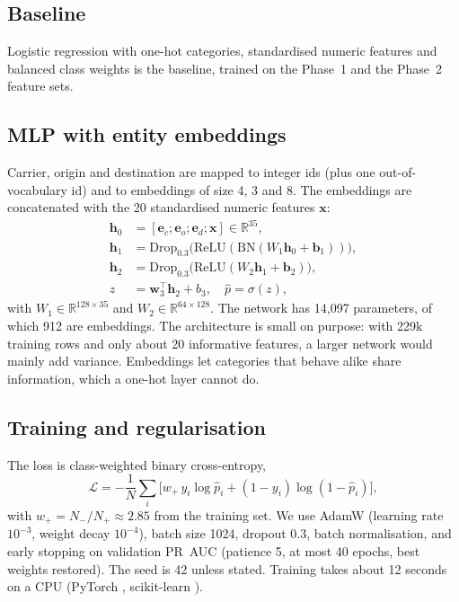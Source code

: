 \documentclass[conference]{IEEEtran}
\begin{document}
\subsection{Baseline}
Logistic regression with one-hot categories, standardised numeric features and balanced class weights is the baseline, trained on the Phase~1 and the Phase~2 feature sets.

\subsection{MLP with entity embeddings}
Carrier, origin and destination are mapped to integer ids (plus one out-of-vocabulary id) and to embeddings of size 4, 3 and 8. The embeddings are concatenated with the 20 standardised numeric features $\mathbf{x}$:
\begin{align}
\mathbf{h}_0 &= [\mathbf{e}_c;\mathbf{e}_o;\mathbf{e}_d;\mathbf{x}]\in\mathbb{R}^{35},\\
\mathbf{h}_1 &= \mathrm{Drop}_{0.3}\!\big(\mathrm{ReLU}(\mathrm{BN}(W_1\mathbf{h}_0+\mathbf{b}_1))\big),\\
\mathbf{h}_2 &= \mathrm{Drop}_{0.3}\!\big(\mathrm{ReLU}(W_2\mathbf{h}_1+\mathbf{b}_2)\big),\\
z &= \mathbf{w}_3^{\top}\mathbf{h}_2+b_3,\quad \hat p=\sigma(z),
\end{align}
with $W_1\in\mathbb{R}^{128\times35}$ and $W_2\in\mathbb{R}^{64\times128}$. The network has 14,097 parameters, of which 912 are embeddings. The architecture is small on purpose: with 229k training rows and only about 20 informative features, a larger network would mainly add variance. Embeddings let categories that behave alike share information, which a one-hot layer cannot do.

\subsection{Training and regularisation}
The loss is class-weighted binary cross-entropy,
\begin{equation}
\mathcal{L}=-\frac1N\sum_{i}\big[w_{+}\,y_i\log\hat p_i+(1-y_i)\log(1-\hat p_i)\big],
\end{equation}
with $w_+=N_-/N_+\approx 2.85$ from the training set. We use AdamW (learning rate $10^{-3}$, weight decay $10^{-4}$), batch size 1024, dropout 0.3, batch normalisation, and early stopping on validation PR~AUC (patience 5, at most 40 epochs, best weights restored). The seed is 42 unless stated. Training takes about 12 seconds on a CPU (PyTorch \cite{paszke}, scikit-learn \cite{sklearn}).
\end{document}
